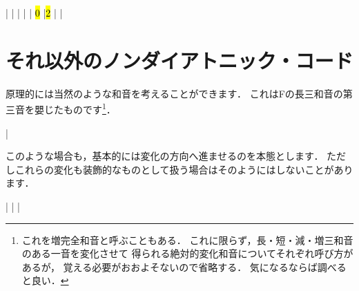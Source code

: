 \documentclass[dvipdfmx,uplatex,b5paper,openany,jbase=12Q,nomag*,textwidth-limit=44%
               ]{gachimuchi}
\begin{document}
\begin{Music}
  \generalmeter{\meterC}%
  \Startpiece
  \NOTes%
  |%
  \en%
  \NOtes%
  |%
  \en\bar%
  \NOTEs%
  |%
  \en\doublebar%
  \NOTes%
  |%
  \hl{0}%
  \en%
  \NOtes%
  |\hl{2}%
  \en\bar%
  \NOTEs%
  |%
  \en\setdoublebar%
  \endpiece%
\end{Music}

\section{それ以外のノンダイアトニック・コード}
原理的には当然のような和音を考えることができます．
これはFの長三和音の第三音を嬰じたものです\footnote{
  これを増完全和音と呼ぶこともある．
  これに限らず，長・短・減・増三和音のある一音を変化させて
  得られる絶対的変化和音についてそれぞれ呼び方があるが，
  覚える必要がおおよそないので省略する．
  気になるならば調べると良い．
}．
\begin{Music}[.3\linewidth]
  \Startpiece
  \Notes%
  \figbassuu[\txSharp]%
  |%
  \en\setdoublebar%
  \endpiece%
\end{Music}

このような場合も，基本的には変化の方向へ進ませるのを本態とします．
ただしこれらの変化も装飾的なものとして扱う場合はそのようにはしないことがあります．
\begin{Music}[.6\linewidth]
  \Startpiece
  \NOTes%
  \figbassuu[\txSharp]%
  |%
  \en\bar%
  \NOTes%
  \figbassuu[\txSharp][6]%
  \figbassuu[\txSharp]%
  |%
  \en\setdoublebar%
  \endpiece%
\end{Music}
\end{document}
